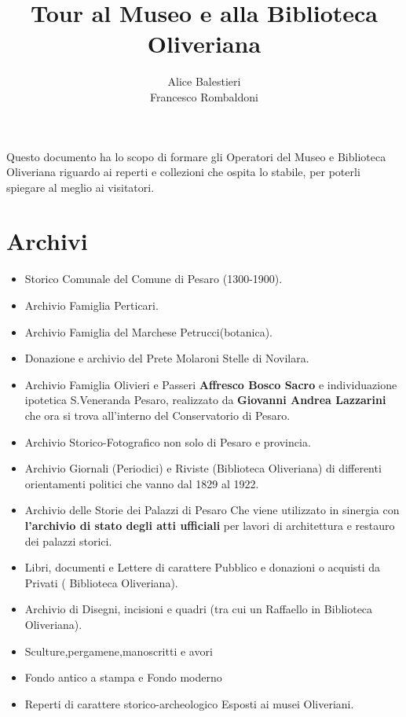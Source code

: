 \documentclass[hidelinks,12pt,a4paper]{article}
\begin{document}
	\begin{flushleft}
		
		\title{\textbf{Tour al Museo e alla Biblioteca Oliveriana}}
		\author{Alice Balestieri\\Francesco Rombaldoni}
		\date{} 
		 
	  	\maketitle
	    
		\setcounter{page}{1}
		\newpage
		\vspace*{\fill}
			Questo documento ha lo scopo di formare gli Operatori del Museo e Biblioteca Oliveriana riguardo ai reperti e collezioni che ospita lo stabile, per poterli spiegare al meglio ai visitatori.
		\vspace*{\fill}
		\newpage
		\tableofcontents
		\newpage
	
		\section{Archivi}
				
		\begin{itemize}
			\item Storico Comunale del Comune di Pesaro (1300-1900).
			\item Archivio Famiglia Perticari.
			\item Archivio Famiglia del Marchese Petrucci(botanica).
			\item Donazione e archivio del Prete Molaroni \textrightarrow Stelle di Novilara.
			\item Archivio Famiglia Olivieri e Passeri \textrightarrow \textbf{Affresco Bosco Sacro} e individuazione ipotetica S.Veneranda Pesaro, realizzato da \textbf{Giovanni Andrea Lazzarini} che ora si trova all'interno del Conservatorio di Pesaro.
			\item Archivio Storico-Fotografico non solo di Pesaro e provincia.
			\item Archivio Giornali (Periodici) e Riviste (Biblioteca Oliveriana) di differenti orientamenti politici che vanno dal 1829 al 1922.
			\item Archivio delle Storie dei Palazzi di Pesaro \textrightarrow Che viene utilizzato in sinergia con \textbf{l'archivio di stato degli atti ufficiali} per lavori di architettura e restauro dei palazzi storici.
			\item Libri, documenti e Lettere di carattere Pubblico e donazioni o acquisti da Privati ( Biblioteca Oliveriana).
			\item Archivio di Disegni, incisioni e quadri (tra cui un Raffaello in Biblioteca Oliveriana).
		    \item Sculture,pergamene,manoscritti e avori
		    \item Fondo antico a stampa e Fondo moderno
	  	\item Reperti di carattere storico-archeologico \textrightarrow Esposti ai musei Oliveriani.			
		\end{itemize}
	

\end{flushleft}
\end{document}
